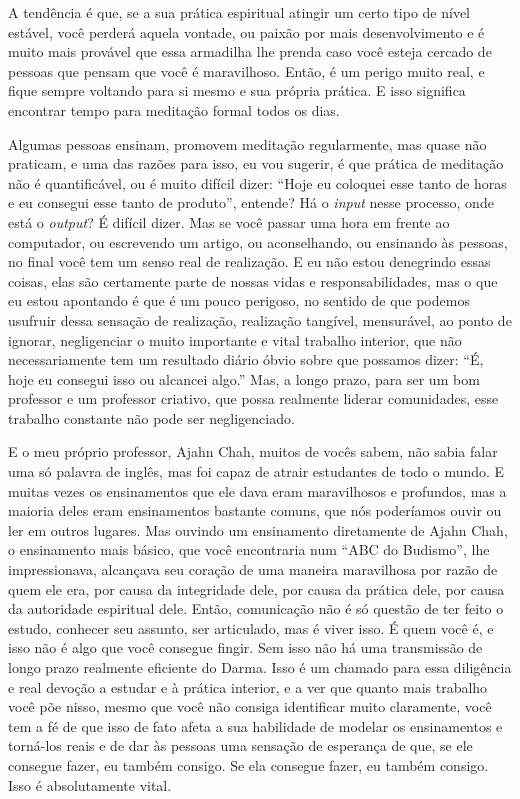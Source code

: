 A tendência é que, se a sua prática espiritual atingir um certo tipo
de nível estável, você perderá aquela vontade, ou paixão por mais
desenvolvimento e é muito mais provável que essa armadilha lhe prenda
caso você esteja cercado de pessoas que pensam que você é maravilhoso.
Então, é um perigo muito real, e fique sempre voltando para si mesmo e
sua própria prática. E isso significa encontrar tempo para meditação
formal todos os dias. 

Algumas pessoas ensinam, promovem meditação regularmente, mas quase
não praticam, e uma das razões para isso, eu vou sugerir, é que prática
de meditação não é quantificável, ou é muito difícil dizer: “Hoje eu
coloquei esse tanto de horas e eu consegui esse tanto de produto”,
entende? Há o \textit{input} nesse processo, onde está o
\textit{output}? É difícil dizer. Mas se você passar uma hora em frente
ao computador, ou escrevendo um artigo, ou aconselhando, ou ensinando
às pessoas, no final você tem um senso real de realização. E eu não
estou denegrindo essas coisas, elas são certamente parte de nossas
vidas e responsabilidades, mas o que eu estou apontando é que é um
pouco perigoso, no sentido de que podemos usufruir dessa sensação de
realização, realização tangível, mensurável, ao ponto de ignorar,
negligenciar o muito importante e vital trabalho interior, que não
necessariamente tem um resultado diário óbvio sobre que possamos dizer:
“É, hoje eu consegui isso ou alcancei algo.” Mas, a longo prazo, para
ser um bom professor e um professor criativo, que possa realmente
liderar comunidades, esse trabalho constante não pode ser
negligenciado. 

E o meu próprio professor, Ajahn Chah, muitos de vocês sabem, não
sabia falar uma só palavra de inglês, mas foi capaz de atrair
estudantes de todo o mundo. E muitas vezes os ensinamentos que ele dava
eram maravilhosos e profundos, mas a maioria deles eram ensinamentos
bastante comuns, que nós poderíamos ouvir ou ler em outros lugares. Mas
ouvindo um ensinamento diretamente de Ajahn Chah, o ensinamento mais
básico, que você encontraria num “ABC do Budismo”, lhe impressionava,
alcançava seu coração de uma maneira maravilhosa por razão de quem ele
era, por causa da integridade dele, por causa da prática dele, por
causa da autoridade espiritual dele. Então, comunicação não é só
questão de ter feito o estudo, conhecer seu assunto, ser articulado,
mas é viver isso. É quem você é, e isso não é algo que você consegue
fingir. Sem isso não há uma transmissão de longo prazo realmente
eficiente do Darma. Isso é um chamado para essa diligência e real
devoção a estudar e à prática interior, e a ver que quanto mais
trabalho você põe nisso, mesmo que você não consiga identificar muito
claramente, você tem a fé de que isso de fato afeta a sua habilidade de
modelar os ensinamentos e torná-los reais e de dar às pessoas uma
sensação de esperança de que, se ele consegue fazer, eu também consigo.
Se ela consegue fazer, eu também consigo. Isso é absolutamente vital. 

